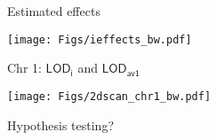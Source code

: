 \documentclass[12pt]{article}
\newcommand{\headsize}{\fontsize{35}{35} \selectfont}
\newcommand{\smallestsize}{\fontsize{18}{22} \selectfont}
\newcommand{\lod}{\text{LOD}}
\begin{document}
\newpage

\headsize \color{myyellow}
\hfill \begin{minipage}{5.75in}
\centering
Estimated effects
\end{minipage}

\vfill

\centerline{\texttt{[image: Figs/ieffects\_bw.pdf]}}


\newpage

\headsize \color{myyellow}
\hfill \begin{minipage}{5.75in}
\centering
Chr 1: $\mathsf{\lod_i}$ and $\mathsf{\lod_{av1}}$
\end{minipage}

\vfill

\centerline{\texttt{[image: Figs/2dscan\_chr1\_bw.pdf]}}


%
%
%
%
%



\newpage

\headsize \color{myyellow}
\hfill \begin{minipage}{5.75in}
\centering
Hypothesis testing?
\end{minipage}

\vspace{2cm}
\end{document}
